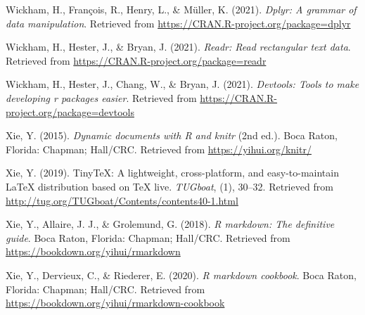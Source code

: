 \documentclass[
  english,
  man]{apa6}
\newlength{\cslhangindent}
\newlength{\cslentryspacingunit} %
\newenvironment{CSLReferences}[2] %
 {%
  \setlength{\parindent}{0pt}
  \ifodd #1
  \let\oldpar\par
  \def\par{\hangindent=\cslhangindent\oldpar}
  \fi
  \setlength{\parskip}{#2\cslentryspacingunit}
 }%
 {}
\begin{document}
\begin{CSLReferences}{1}{0}
\leavevmode{}%
Wickham, H., François, R., Henry, L., \& Müller, K. (2021). \emph{Dplyr: A grammar of data manipulation}. Retrieved from \url{https://CRAN.R-project.org/package=dplyr}

\leavevmode{}%
Wickham, H., Hester, J., \& Bryan, J. (2021). \emph{Readr: Read rectangular text data}. Retrieved from \url{https://CRAN.R-project.org/package=readr}

\leavevmode{}%
Wickham, H., Hester, J., Chang, W., \& Bryan, J. (2021). \emph{Devtools: Tools to make developing r packages easier}. Retrieved from \url{https://CRAN.R-project.org/package=devtools}

\leavevmode{}%
Xie, Y. (2015). \emph{Dynamic documents with {R} and knitr} (2nd ed.). Boca Raton, Florida: Chapman; Hall/CRC. Retrieved from \url{https://yihui.org/knitr/}

\leavevmode{}%
Xie, Y. (2019). TinyTeX: A lightweight, cross-platform, and easy-to-maintain LaTeX distribution based on TeX live. \emph{TUGboat}, (1), 30--32. Retrieved from \url{http://tug.org/TUGboat/Contents/contents40-1.html}

\leavevmode{}%
Xie, Y., Allaire, J. J., \& Grolemund, G. (2018). \emph{R markdown: The definitive guide}. Boca Raton, Florida: Chapman; Hall/CRC. Retrieved from \url{https://bookdown.org/yihui/rmarkdown}

\leavevmode{}%
Xie, Y., Dervieux, C., \& Riederer, E. (2020). \emph{R markdown cookbook}. Boca Raton, Florida: Chapman; Hall/CRC. Retrieved from \url{https://bookdown.org/yihui/rmarkdown-cookbook}

\end{CSLReferences}
\end{document}
